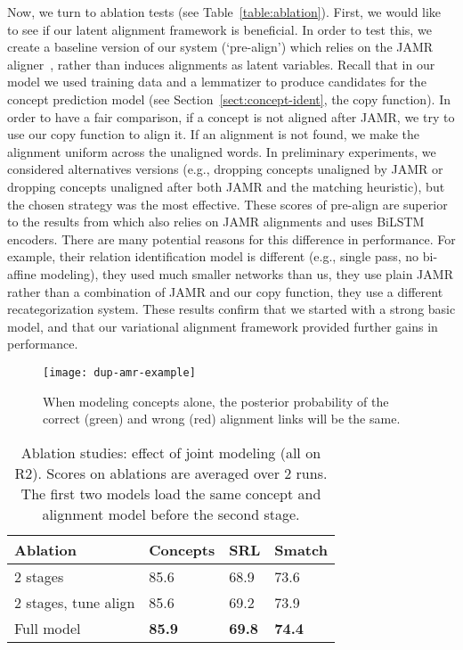 \documentclass[11pt,a4paper]{article}
\begin{document}
Now, we turn to ablation tests (see Table~\ref{table:ablation}). First, we would like to see if our latent alignment framework is beneficial. In order to
test this, we create a baseline version of our system  (`pre-align') which relies on the JAMR aligner~\cite{Flanigan_adiscriminative}, rather than 
induces alignments as latent variables. Recall that in our model we used training data and a lemmatizer to produce candidates for the concept prediction model (see Section~\ref{sect:concept-ident}, the copy  function). In order to have a fair comparison, if a concept is not aligned after JAMR, we try to use our copy function to align it. If an alignment is not found, we make the alignment uniform across the unaligned words. In preliminary experiments, we considered alternatives versions (e.g., dropping concepts unaligned by JAMR or dropping concepts unaligned after both JAMR and the matching heuristic), but the chosen strategy was the most effective. 
These scores of pre-align are superior to the results from   which also relies on JAMR alignments and uses BiLSTM encoders. There are many potential reasons for this difference in performance. For example,  their relation identification model is different (e.g., single pass, no bi-affine modeling), they used much smaller networks than us,
they use plain JAMR rather than a combination of JAMR and our copy function, they use a different recategorization system.
These results confirm that we started with a strong basic model, and that our variational alignment framework provided further gains in performance.



\begin{figure}[t!]
\centering
\texttt{[image: dup-amr-example]}
\vspace{-2ex}
\caption{When modeling concepts alone, the posterior probability of the correct (green) and wrong (red) alignment links will be the same.} 
\label{fig:dup-example}
\end{figure}

\begin{table}[t]
    \begin{center} 
        \begin{tabular}{llll} 
            \hline  Ablation   &   Concepts &    SRL   & Smatch \\\hline
            2 stages     &85.6& 68.9&73.6\\
            2 stages, tune align      & 85.6 & 69.2& 73.9\\
            
Full model      &\bf85.9& \bf 69.8& {\bf 74.4}\\
            \hline
        \end{tabular}
    \end{center}
    \vspace{-2ex}
	\caption{\label{table:ablation2} Ablation studies: effect of joint modeling (all on R2). Scores on ablations are averaged over 2 runs. The first two models load  the same concept and alignment model before the second stage. 
    }
    \vspace{-2ex}
\end{table}
\end{document}
